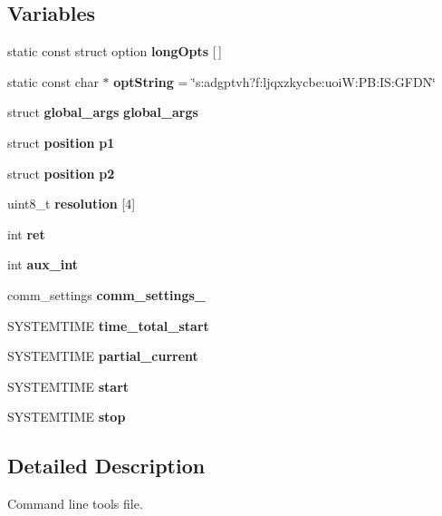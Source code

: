 \subsection*{Variables}
\begin{DoxyCompactItemize}
\item 
static const struct option {\bfseries long\+Opts} [$\,$]
\item 
\mbox{\label{qbadmin_8c_a1b7271ddd60c22960c39ae6caf4d5254}} 
static const char $\ast$ {\bfseries opt\+String} = \char`\"{}s\+:adgptvh?f\+:ljqxzkycbe\+:uoi\+W\+:\+P\+B\+:\+I\+S\+:\+G\+F\+DN\char`\"{}
\item 
\mbox{\label{qbadmin_8c_ac8e0866643ba994eff3e2fa3203885e0}} 
struct \textbf{ global\+\_\+args} {\bfseries global\+\_\+args}
\item 
\mbox{\label{qbadmin_8c_a821afb7ce4f1050e40bf615da3259a67}} 
struct \textbf{ position} {\bfseries p1}
\item 
\mbox{\label{qbadmin_8c_aeb1c5de60c0abd963c4b508d9f4c3cb1}} 
struct \textbf{ position} {\bfseries p2}
\item 
\mbox{\label{qbadmin_8c_a761d62937db066110a8f3e1479e8c404}} 
uint8\+\_\+t {\bfseries resolution} [4]
\item 
\mbox{\label{qbadmin_8c_a6baa346e44f4c2158d2be4f9b77b8203}} 
int {\bfseries ret}
\item 
\mbox{\label{qbadmin_8c_abf8643fca8c83efc67b50d0f2ecc8534}} 
int {\bfseries aux\+\_\+int}
\item 
\mbox{\label{qbadmin_8c_ae80455d5ff9aa4415b211f9842cb885e}} 
comm\+\_\+settings {\bfseries comm\+\_\+settings\+\_}
\item 
\mbox{\label{qbadmin_8c_ab7561703ea7d6e95482c3c0aa4ce41bd}} 
S\+Y\+S\+T\+E\+M\+T\+I\+ME {\bfseries time\+\_\+total\+\_\+start}
\item 
\mbox{\label{qbadmin_8c_a59b8b03e528e04c3dbecd1e9fe3974b4}} 
S\+Y\+S\+T\+E\+M\+T\+I\+ME {\bfseries partial\+\_\+current}
\item 
\mbox{\label{qbadmin_8c_ac6a05db4d435b75094fe1a5db5ce8e93}} 
S\+Y\+S\+T\+E\+M\+T\+I\+ME {\bfseries start}
\item 
\mbox{\label{qbadmin_8c_aeff73859b4ae7da1519b66f83770e1a7}} 
S\+Y\+S\+T\+E\+M\+T\+I\+ME {\bfseries stop}
\end{DoxyCompactItemize}


\subsection{Detailed Description}
Command line tools file. 

